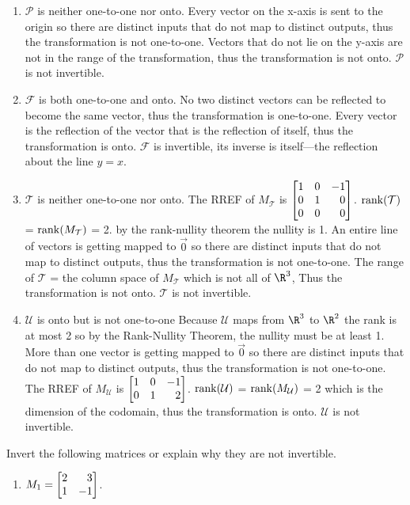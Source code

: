 \begin{exercises}
\begin{problist}
\begin{solution}
\begin{enumerate}
				\item
				$\mathcal P$ is neither one-to-one nor onto.
				Every vector on the x-axis is sent to the origin so there are distinct
				inputs that do not map to distinct outputs,
				thus the transformation is not one-to-one.
				Vectors that do not lie on the y-axis are not in the range of the
				transformation,
				thus the transformation is not onto.
				$\mathcal P$ is not invertible.

				\item
				$\mathcal F$ is both one-to-one and onto.
				No two distinct vectors can be reflected to become the same vector,
				thus the transformation is one-to-one.
				Every vector is the reflection of the vector that is the reflection of
				itself,
				thus the transformation is onto.
				$\mathcal F$ is invertible, its inverse is itself---the reflection about
				the line $y=x$.

				\item
				$\mathcal T$ is neither one-to-one nor onto.
				The RREF of $M_{\mathcal T}$ is $\mat{1&0&-1\\0&1&0\\0&0&0}$.
				$\operatorname{rank}(\mathcal T)$ = $\operatorname{rank}(M_{\mathcal T})$ = 2.
				by the rank-nullity theorem the nullity is 1.
				An entire line of vectors is getting mapped to
				$\vec{0}$ so there are distinct inputs that do not map to distinct
				outputs,
				thus the transformation is not one-to-one.
				The range of $\mathcal T$ = the column space of $M_{\mathcal T}$
				which is not all of $\R^{3}$,
				Thus the transformation is not onto.
				$\mathcal T$ is not invertible.

				\item
				$\mathcal U$ is onto but is not one-to-one
				Because $\mathcal U$ maps from $\R^{3}$ to $\R^{2}$ the rank is at most
				2 so by the Rank-Nullity Theorem, the nullity must be at least 1. More
				than one vector is getting mapped to $\vec{0}$ so there are distinct
				inputs that do not map to distinct outputs,
				thus the transformation is not one-to-one.
				The RREF of $M_{\mathcal U}$ is $\mat{1&0&-1\\0&1&2}$.
				$\operatorname{rank}(\mathcal U)$ = $\operatorname{rank}(M_{\mathcal U})$ = 2 which is
				the dimension of the codomain,
				thus the transformation is onto.
				$\mathcal U$ is not invertible.

			\end{enumerate}
		\end{solution}


		\prob Invert the following matrices or explain why they are not invertible.
		\begin{enumerate}
			\item $M_{1} = \mat{2&3\\1&-1}$.


\end{enumerate}
\end{problist}
\end{exercises}

